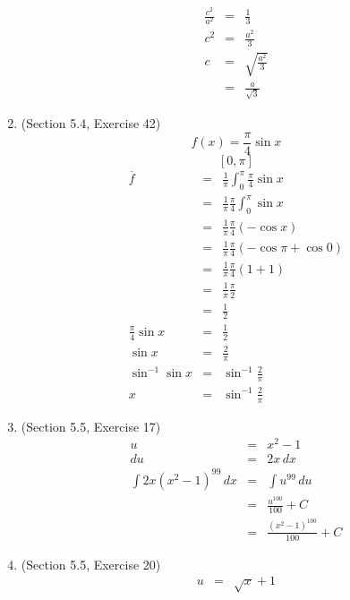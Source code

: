 \documentclass{article}
\begin{document}
\begin{enumerate}
\begin{eqnarray}
            \frac{c^2}{a^2} &=& \frac{1}{3} \\
            c^2 &=& \frac{a^2}{3} \\
            c &=& \sqrt{\frac{a^2}{3}} \\
              &=& \frac{a}{\sqrt{3}}
        \end{eqnarray}
    \item (Section 5.4, Exercise 42)
        $$f(x) = \frac{\pi}{4}\sin{x}$$
        $$[0, \pi]$$
        \begin{eqnarray}
            \overline{f} &=& \frac{1}{\pi}\int_0^{\pi}{\frac{\pi}{4}\sin{x}} \\
                         &=& \frac{1}{\pi}\frac{\pi}{4}\int_0^{\pi}{\sin{x}} \\
                         &=& \frac{1}{\pi}\frac{\pi}{4}\left(-\cos{x}\right) \\
                         &=& \frac{1}{\pi}\frac{\pi}{4}\left(-\cos{\pi} + \cos{0}\right) \\
                         &=& \frac{1}{\pi}\frac{\pi}{4}\left(1 + 1\right) \\
                         &=& \frac{1}{\pi}\frac{\pi}{2} \\
                         &=& \frac{1}{2} \\
            \frac{\pi}{4}\sin{x} &=& \frac{1}{2} \\
            \sin{x} &=& \frac{2}{\pi} \\
            \sin^{-1}{\sin{x}} &=& \sin^{-1}{\frac{2}{\pi}} \\
            x &=& \sin^{-1}{\frac{2}{\pi}}
        \end{eqnarray}
    \item (Section 5.5, Exercise 17)
        \begin{eqnarray}
            u &=& x^2 - 1 \\
            du &=& 2x\,dx \\
            \int{2x\left(x^2 - 1\right)^{99}\,dx} &=& \int{u^{99}\,du} \\
                                                  &=& \frac{u^{100}}{100} + C \\
                                                  &=& \frac{\left(x^2 - 1\right)^{100}}{100} + C
        \end{eqnarray}
    \item (Section 5.5, Exercise 20)
        \begin{eqnarray}
            u &=& \sqrt{x} + 1 \\

\end{eqnarray}
\end{enumerate}
\end{document}
